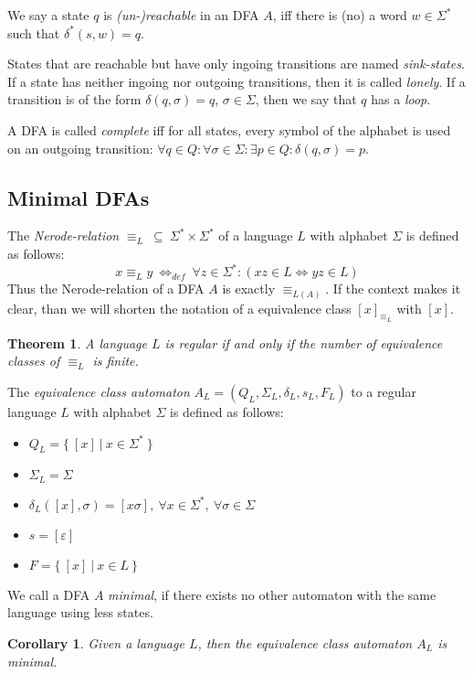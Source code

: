\documentclass[a4paper, oneside, 11pt]{report}
\newtheorem{theorem}{Theorem}
\newtheorem{corollary}{Corollary}
\theoremstyle{definition}
\theoremstyle{remark}
\begin{document}
We say a state $q$ is \emph{(un-)reachable} in an DFA $A$, iff there is (no) a word $w \in \Sigma^*$ such that $\delta^*(s, w) = q$.

States that are reachable but have only ingoing transitions are named \emph{sink-states}.
If a state has neither ingoing nor outgoing transitions, then it is called \emph{lonely}.
If a transition is of the form $\delta(q, \sigma) = q$, $\sigma\in\Sigma$, then we say that $q$ has a \emph{loop}.

A DFA is called \emph{complete} iff for all states, every symbol of the alphabet is used on an outgoing transition: $\forall q\in Q\colon \forall\sigma\in\Sigma\colon \exists p\in Q\colon \delta(q,\sigma) = p$.

\subsection{Minimal DFAs}

The \emph{Nerode-relation} $\equiv_L\ \subseteq\ \Sigma^* \times \Sigma^*$ of a language $L$ with alphabet $\Sigma$ is defined as follows:
\begin{displaymath}
	x \equiv_L y\ \Leftrightarrow_{def}\ \forall z\in\Sigma^*\colon (xz\in L \Leftrightarrow yz\in L)
\end{displaymath}
Thus the Nerode-relation of a DFA $A$ is exactly $\equiv_{L(A)}$. If the context makes it clear, than we will shorten the notation of a equivalence class $[x]_{\equiv_L}$ with $[x]$.

\begin{theorem}
	A language $L$ is regular if and only if the number of equivalence classes of $\equiv_L$ is finite.
\end{theorem}

The \emph{equivalence class automaton} $A_L = (Q_L, \Sigma_L, \delta_L, s_L, F_L)$ to a regular language $L$ with alphabet $\Sigma$ is defined as follows:
\begin{itemize}
	\item $Q_L = \{\ [x]\ |\ x \in \Sigma^*\ \}$
	\item $\Sigma_L = \Sigma$
	\item $\delta_L([x], \sigma) = [x\sigma],\ \forall x\in\Sigma^*,\ \forall\sigma\in\Sigma$
	\item $s = [\varepsilon]$
	\item $F = \{\ [x]\ |\ x \in L\ \}$
\end{itemize}
We call a DFA $A$ \emph{minimal}, if there exists no other automaton with the same language using less states.
\begin{corollary}
	Given a language $L$, then the equivalence class automaton $A_L$ is minimal.
\end{corollary}
\end{document}
